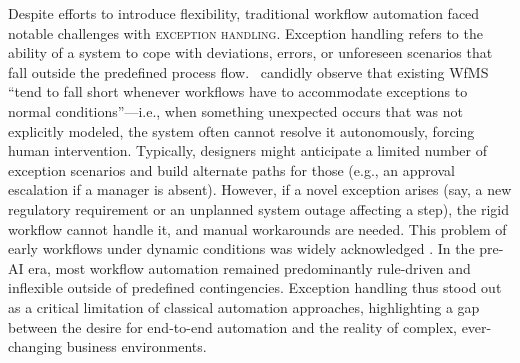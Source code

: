 Despite efforts to introduce flexibility, traditional workflow automation faced notable challenges with \textsc{exception handling}. Exception handling refers to the ability of a system to cope with deviations, errors, or unforeseen scenarios that fall outside the predefined process flow.~\textcite{basuResearch2002} candidly observe that existing WfMS \enquote{tend to fall short whenever workflows have to accommodate exceptions to normal conditions}---i.e., when something unexpected occurs that was not explicitly modeled, the system often cannot resolve it autonomously, forcing human intervention. Typically, designers might anticipate a limited number of exception scenarios and build alternate paths for those (e.g., an approval escalation if a manager is absent). However, if a novel exception arises (say, a new regulatory requirement or an unplanned system outage affecting a step), the rigid workflow cannot handle it, and manual workarounds are needed. This problem of early workflows under dynamic conditions was widely acknowledged \parencite{georgakopoulosOverview1995}. In the pre-AI era, most workflow automation remained predominantly rule-driven and inflexible outside of predefined contingencies. Exception handling thus stood out as a critical limitation of classical automation approaches, highlighting a gap between the desire for end-to-end automation and the reality of complex, ever-changing business environments.

